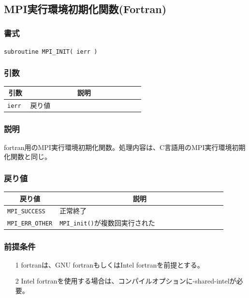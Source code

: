 \documentclass[twoside,11pt,fleqn]{book}
\begin{document}
{\subsection{MPI実行環境初期化関数(Fortran)}
\subsubsection*{書式}{\quad} \texttt{subroutine MPI\_INIT( ierr )}
\subsubsection*{引数}{\quad}
\begin{table}[!ht]
\footnotesize
\begin{tabular}{|p{0.15\linewidth}|p{0.75\linewidth}|} \hline
\multicolumn{1}{|c}{\textbf{引数}}&\multicolumn{1}{|c|}{\textbf{説明}}\\ \hline \hline
\texttt{ierr}&戻り値\\ \hline
\end{tabular}
\vspace{-0em}
\end{table}
\subsubsection*{説明}{\quad}
fortran用のMPI実行環境初期化関数。処理内容は、C言語用のMPI実行環境初期化関数と同じ。
\subsubsection*{戻り値}{\quad}
\begin{table}[!ht]
\footnotesize
\begin{tabular}{|p{0.15\linewidth}|p{0.75\linewidth}|} \hline
\multicolumn{1}{|c}{\textbf{戻り値}}&\multicolumn{1}{|c|}{\textbf{説明}}\\ \hline \hline
\texttt{MPI\_SUCCESS}&正常終了\\ \hline
\texttt{MPI\_ERR\_OTHER }&\texttt{MPI\_init()}が複数回実行された\\ \hline
\end{tabular}
\vspace{-0em}
\end{table}
\subsubsection*{前提条件}{\quad}
\begin{itemize}
\item[1]fortranは、GNU fortranもしくはIntel fortranを前提とする。
\item[2]Intel fortranを使用する場合は、コンパイルオプションに-shared-intelが必要。
\end{itemize}
\FloatBarrier
}
\end{document}
